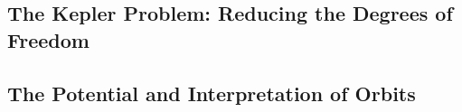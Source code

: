 \subsection{The Kepler Problem: Reducing the Degrees of Freedom}
\subsection{The Potential and Interpretation of Orbits}